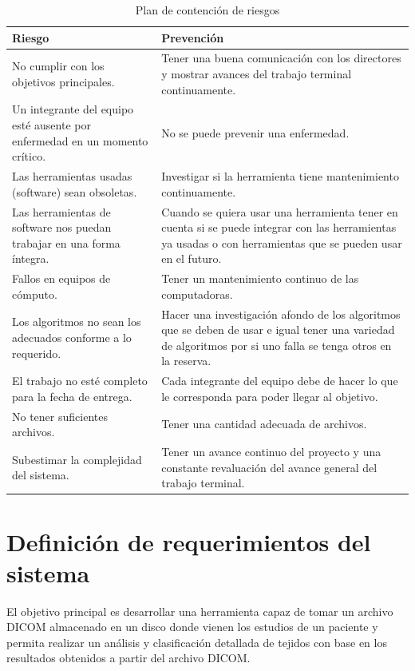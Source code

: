 \documentclass[12pt]{report}
\begin{document}
\begin{table}[H]
\begin{center}
\begin{tabular}{|p{70mm}|p{70mm}|}
\hline
 Riesgo & Prevención \\
\hline \hline 
No cumplir con los objetivos principales. & Tener una buena comunicación con los directores y mostrar avances del trabajo terminal continuamente.\\
\hline
Un integrante del equipo esté ausente por enfermedad en un momento crítico. & No se puede prevenir una enfermedad.\\
\hline
Las herramientas usadas (software) sean obsoletas. & Investigar si la herramienta tiene mantenimiento continuamente. \\
\hline
Las herramientas de software nos puedan trabajar en una forma íntegra. & Cuando se quiera usar una herramienta tener en cuenta si se puede integrar con las herramientas ya usadas o con herramientas que se pueden usar en el futuro.\\
\hline
Fallos en equipos de cómputo. & Tener un mantenimiento continuo de las computadoras.\\
\hline
Los algoritmos no sean los adecuados conforme a lo requerido. & Hacer una investigación afondo de los algoritmos que se deben de usar e igual tener una variedad de algoritmos por si uno falla se tenga otros en la reserva.\\
\hline
El trabajo no esté completo para la fecha de entrega. & Cada integrante del equipo debe de hacer lo que le corresponda para poder llegar al objetivo.\\
\hline
No tener suficientes archivos. & Tener una cantidad adecuada de archivos. \\
\hline
Subestimar la complejidad del sistema. & Tener un avance continuo del proyecto y una constante revaluación del avance general del trabajo terminal.\\
\hline
\end{tabular}
\caption{Plan de contención de riesgos}
\end{center}
\end{table}


\section{Definición de requerimientos del sistema}
El objetivo principal es desarrollar una herramienta capaz de tomar un archivo DICOM almacenado en un disco donde vienen los estudios de un paciente y permita realizar un análisis y clasificación detallada de tejidos con base en los resultados obtenidos a partir del archivo DICOM.\\ 
\end{document}
